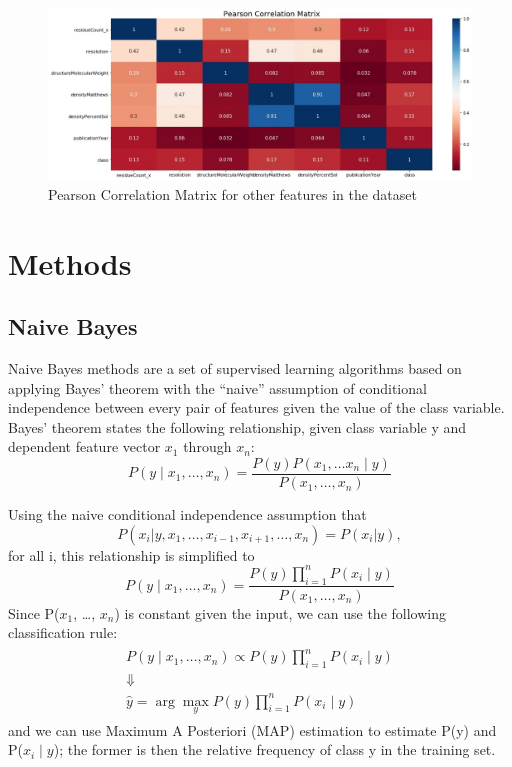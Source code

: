 \documentclass[sigconf]{acmart}
\begin{document}
\begin{figure}
  \centering
  \includegraphics[width=\linewidth]{2.jpeg}
  \caption{Pearson Correlation Matrix for other features in the dataset}
  \label{1}
\end{figure}

\section{Methods}
\subsection{Naive Bayes}
Naive Bayes methods are a set of supervised learning algorithms based on applying Bayes’ theorem with the “naive” assumption of conditional independence between every pair of features given the value of the class variable\cite{patil2013performance}. Bayes’ theorem states the following relationship, given class variable y and dependent feature vector $x_1$ through $x_n$:
\begin{equation}
    P(y \mid x_1, \dots, x_n) = \frac{P(y) P(x_1, \dots x_n \mid y)}{P(x_1, \dots, x_n)}
\end{equation}

Using the naive conditional independence assumption that
\begin{equation}
    P(x_i | y, x_1, \dots, x_{i-1}, x_{i+1}, \dots, x_n) = P(x_i | y),
\end{equation}
for all i, this relationship is simplified to
\begin{equation}
    P(y \mid x_1, \dots, x_n) = \frac{P(y) \prod_{i=1}^{n} P(x_i \mid y)}{P(x_1, \dots, x_n)}
\end{equation}
Since P($x_1$, \dots, $x_n$) is constant given the input, we can use the following classification rule:
\begin{align}
\begin{aligned}
    P(y \mid x_1, \dots, x_n) \propto P(y) \prod_{i=1}^{n} P(x_i \mid y)\\\Downarrow\\\hat{y} = \arg\max_y P(y) \prod_{i=1}^{n} P(x_i \mid y)
\end{aligned}
\end{align}
and we can use Maximum A Posteriori (MAP) estimation to estimate P(y) and P($x_i \mid y$); the former is then the relative frequency of class y in the training set.
\end{document}
